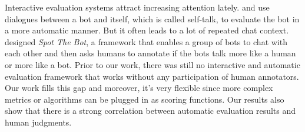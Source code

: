 
Interactive evaluation systems attract increasing attention lately. 
\citet{DBLP:journals/corr/abs-1906-09308} and 
\citet{deriu-cieliebak-2019-towards} use dialogues between a bot and itself, 
which is called self-talk, to evaluate the bot in a more automatic manner. 
But it often leads to a lot of repeated chat context.
\citet{deriu-etal-2020-spot} designed \textit{Spot The Bot}, 
a framework that enables a group of bots to chat with each other and 
then asks humans to annotate if the bots talk more like a human or more like a
bot. Prior to our work, there was still no interactive and automatic 
evaluation framework that works without any participation of 
human annotators. 
Our work fills this gap and moreover, it's very flexible since 
more complex metrics or algorithms can be plugged in as 
scoring functions.  Our results also show that there is a strong 
correlation between automatic evaluation results and human judgments.
